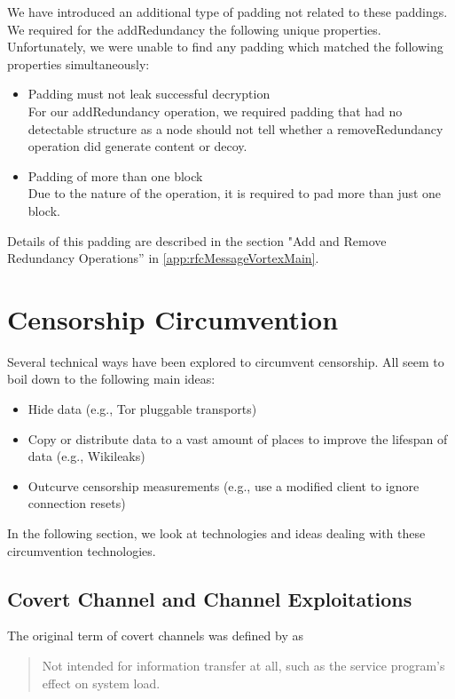 We have introduced an additional type of padding not related to these paddings. We required for the addRedundancy the following unique properties. Unfortunately, we were unable to find any padding which matched the following properties simultaneously:

\begin{itemize}
	\item Padding must not leak successful decryption\\
	For our addRedundancy operation, we required padding that had no detectable structure as a node should not tell whether a removeRedundancy operation did generate content or decoy. 
	\item Padding of more than one block\\
	Due to the nature of the operation, it is required to pad more than just one block.
\end{itemize}

Details of this padding are described in the section "Add and Remove Redundancy Operations'' in \cref{app:rfcMessageVortexMain}. 

\chapter{Censorship Circumvention}
Several technical ways have been explored to circumvent censorship. All seem to boil down to the following main ideas:
\begin{itemize}
	\item Hide data (e.g., Tor pluggable transports)
	\item Copy or distribute data to a vast amount of places to improve the lifespan of data (e.g., Wikileaks)
	\item Outcurve censorship measurements (e.g., use a modified client to ignore connection resets)
\end{itemize}

In the following section, we look at technologies and ideas dealing with these circumvention technologies.

\section{Covert Channel and Channel Exploitations}
The original term of covert channels was defined by \citeauthor{Lampson73anote}\cite{Lampson73anote} as 

\begin{quote}
	Not intended for information transfer at all, such as the service program's effect on system load.
\end{quote}

